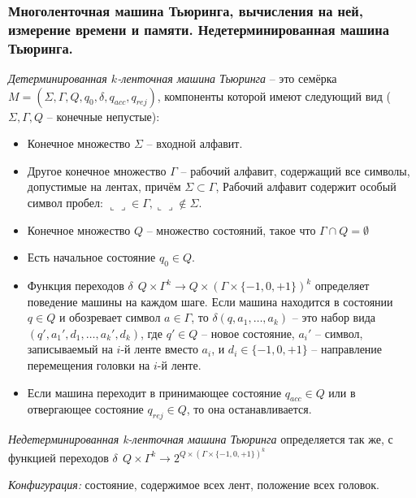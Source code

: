 \subsubsection{Многоленточная машина Тьюринга, вычисления на ней, измерение времени и памяти. Недетерминированная машина Тьюринга.}
\begin{definition} \textit{Детерминированная $k$-ленточная машина Тьюринга} -- это семёрка
\newline $M = (\Sigma, \Gamma, Q, q_0, \delta, q_{acc}, q_{rej} )$, компоненты которой имеют следующий вид ($\Sigma, \Gamma, Q$ -- конечные непустые):
\begin{itemize}
    \item Конечное множество $\Sigma$ -- входной алфавит.
    \item Другое конечное множество $\Gamma$ -- рабочий алфавит, содержащий все символы, допустимые на лентах, причём $\Sigma \subset \Gamma$, Рабочий алфавит содержит особый символ пробел: $\llcorner\lrcorner \in \Gamma, \llcorner\lrcorner \notin \Sigma$.
    \item Конечное множество $Q$ -- множество состояний, такое что $\Gamma \cap Q = \emptyset$
    \item Есть начальное состояние $q_0 \in Q$.
    \item Функция переходов $\delta \: \ Q\times\Gamma^k \to Q\times(\Gamma\times\{-1, 0, +1\})^k$ определяет поведение машины на каждом шаге. 
    Если машина находится в состоянии $q \in Q$ и обозревает символ $a \in\Gamma$, то $\delta(q, a_1, \ldots , a_k)$ -- это набор вида $(q',a_1', d_1, \ldots, a_k', d_k)$, 
    где $q' \in Q$ -- новое состояние, $a_i'$ -- символ, записываемый на $i$-й ленте вместо $a_i$, и $d_i \in \{-1, 0, +1\}$ -- направление перемещения головки на $i$-й ленте.
    \item Если машина переходит в принимающее состояние $q_{acc} \in Q$ или в отвергающее состояние $q_{rej} \in Q$, то она останавливается.

\end{itemize}
\end{definition}

\begin{definition} 
\textit{Недетерминированная k-ленточная машина Тьюринга} определяется так же, с функцией переходов $\delta \: \ Q\times\Gamma^k \to 2^{Q\times(\Gamma\times\{-1, 0, +1\})^k}$
\end{definition}

\textit{Конфигурация:} состояние, содержимое всех лент, положение всех головок. 

